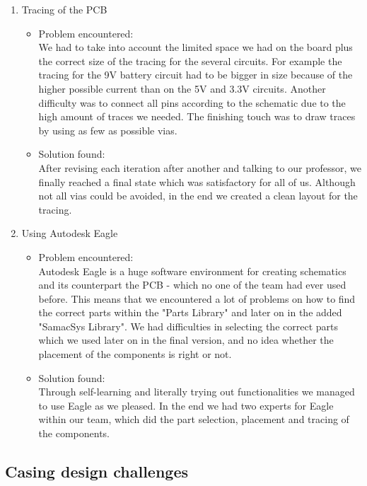 \begin{enumerate}
  \item Tracing of the PCB
    \begin{itemize}
      \item Problem encountered:\\
      We had to take into account the limited space we had on the board plus the correct size of the tracing for the several circuits. For example the tracing for the 9V battery circuit had to be bigger in size because of the higher possible current than on the 5V and 3.3V circuits.
      Another difficulty was to connect all pins according to the schematic due to the high amount of traces we needed. The finishing touch was to draw traces by using as few as possible vias.
      \item Solution found:\\
      After revising each iteration after another and talking to our professor, we finally reached a final state which was satisfactory for all of us. Although not all vias could be avoided, in the end we created a clean layout for the tracing.
    \end{itemize}
  \item Using Autodesk Eagle
    \begin{itemize}
      \item Problem encountered:\\
      Autodesk Eagle is a huge software environment for creating schematics and its counterpart the PCB - which no one of the team had ever used before. This means that we encountered a lot of problems on how to find the correct parts within the "Parts Library" and later on in the added "SamacSys Library". We had difficulties in selecting the correct parts which we used later on in the final version, and no idea whether the placement of the components is right or not. 
      \item Solution found:\\
      Through self-learning and literally trying out functionalities we managed to use Eagle as we pleased. In the end we had two experts for Eagle within our team, which did the part selection, placement and tracing of the components.
    \end{itemize}
\end{enumerate}

\subsection{Casing design challenges}

